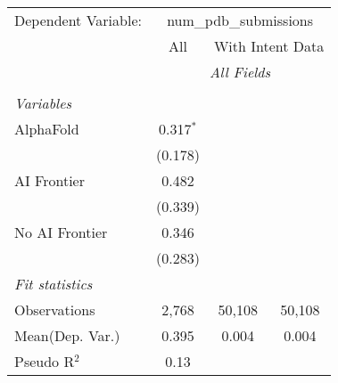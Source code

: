 \begingroup
\centering
\begin{tabular}{lccc}
   \tabularnewline \midrule \midrule
   Dependent Variable: & \multicolumn{3}{c}{num\_pdb\_submissions}\\
 & \multicolumn{1}{c}{All} & \multicolumn{2}{c}{With Intent Data} \\
\cmidrule(lr){2-2} \cmidrule(lr){3-4}
 & \multicolumn{3}{c}{\textit{All Fields}} \\ \\
   \emph{Variables}\\
   AlphaFold      & 0.317$^{*}$ &        &   \\   
                  & (0.178)     &        &   \\   
   AI Frontier    & 0.482       &        &   \\   
                  & (0.339)     &        &   \\   
   No AI Frontier & 0.346       &        &   \\   
                  & (0.283)     &        &   \\   
   \midrule
   \emph{Fit statistics}\\
   Observations   & 2,768       & 50,108 & 50,108\\  
Mean(Dep. Var.) & 0.395 & 0.004 & 0.004 \\
   Pseudo R$^2$   & 0.13        &        & \\  
   

\end{tabular}
